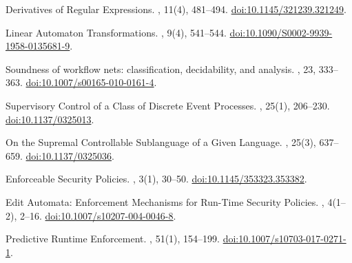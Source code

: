 \documentclass[11pt]{article}
\theoremstyle{definition}
\begin{document}
\begin{OpusReferences}
\newblock Derivatives of Regular Expressions.
\newblock {}, 11(4), 481--494.
\newblock \href{https://doi.org/10.1145/321239.321249}{doi:10.1145/321239.321249}.

\newblock Linear Automaton Transformations.
\newblock {}, 9(4), 541--544.
\newblock \href{https://doi.org/10.1090/S0002-9939-1958-0135681-9}{doi:10.1090/S0002-9939-1958-0135681-9}.

\newblock Soundness of workflow nets: classification, decidability, and analysis.
\newblock {}, 23, 333--363.
\newblock \href{https://doi.org/10.1007/s00165-010-0161-4}{doi:10.1007/s00165-010-0161-4}.

\newblock Supervisory Control of a Class of Discrete Event Processes.
\newblock {}, 25(1), 206--230.
\newblock \href{https://doi.org/10.1137/0325013}{doi:10.1137/0325013}.

\newblock On the Supremal Controllable Sublanguage of a Given Language.
\newblock {}, 25(3), 637--659.
\newblock \href{https://doi.org/10.1137/0325036}{doi:10.1137/0325036}.

\newblock Enforceable Security Policies.
\newblock {}, 3(1), 30--50.
\newblock \href{https://doi.org/10.1145/353323.353382}{doi:10.1145/353323.353382}.

\newblock Edit Automata: Enforcement Mechanisms for Run-Time Security Policies.
\newblock {}, 4(1--2), 2--16.
\newblock \href{https://doi.org/10.1007/s10207-004-0046-8}{doi:10.1007/s10207-004-0046-8}.

\newblock Predictive Runtime Enforcement.
\newblock {}, 51(1), 154--199.
\newblock \href{https://doi.org/10.1007/s10703-017-0271-1}{doi:10.1007/s10703-017-0271-1}.


\end{OpusReferences}
\end{document}

